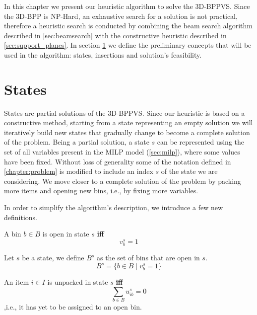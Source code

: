 In this chapter we present our heuristic algorithm to solve the 3D-BPPVS. 
Since the 3D-BPP is NP-Hard, an exhaustive search for a solution is not practical, therefore a heuristic search is conducted by combining the beam search algorithm described in \cref{sec:beamsearch} with the constructive heuristic described in \cref{sec:support_planes}.
In section \ref{sec:problem_state} we define the preliminary concepts that will be used in the algorithm: states, insertions and solution's feasibility.

\section{States}
\label{sec:problem_state}%
States are partial solutions of the 3D-BPPVS. Since our heuristic is based on a constructive method, starting from a state representing an empty solution we will iteratively build new states that gradually change to become a complete solution of the problem.
Being a partial solution, a state $s$ can be represented using the set of all variables present in the MILP model (\ref{sec:milp}), where some values have been fixed. 
Without loss of generality some of the notation defined in \cref{chapter:problem} is modified to include an index $s$ of the state we are considering.
We move closer to a complete solution of the problem by packing more items and opening new bins, i.e., by fixing more variables.

In order to simplify the algorithm's description, we introduce a few new definitions.
\begin{definition}
    A bin $b \in B$ is open in state $s$ \textbf{iff}
    \begin{equation*}
        v^{s}_{b} = 1
    \end{equation*}
\end{definition}

\begin{definition}
    Let $s$ be a state, we define $B^s$ as the set of bins that are open in $s$.
    \begin{equation*}
        B^s = \{ b \in B \mid v^{s}_{b} = 1 \}
    \end{equation*}
\end{definition}

\begin{definition}
    An item $i \in I$ is unpacked in state $s$ \textbf{iff}
    \begin{equation*}
        \sum_{b \in B} u^{s}_{ib} = 0
    \end{equation*}
    ,i.e., it has yet to be assigned to an open bin.
\end{definition}

